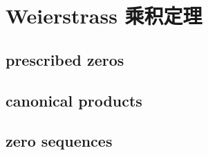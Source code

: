 \section{Weierstrass 乘积定理}
\label{b3:sec:2003}


\subsection{prescribed zeros}
\label{b3:subsec:200301}

\subsection{canonical products}
\label{b3:subsec:200302}

\subsection{zero sequences}
\label{b3:subsec:200303}



